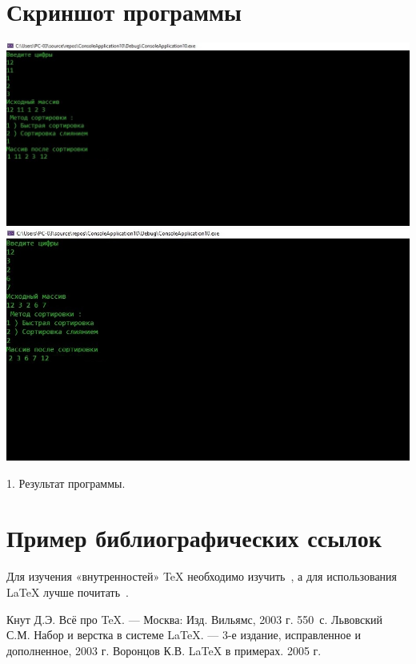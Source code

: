 \documentclass[12pt,a4paper]{scrartcl}
\begin{document}
\section{Скриншот программы}
\label{sec:intro}
\centering
\includegraphics[width=1.0\textwidth]{itog1.jpg}
\includegraphics[width=1.0\textwidth]{itog2.jpg}
\caption{1. Результат программы.}\label{fig:par}
\section{Пример библиографических ссылок}

Для изучения «внутренностей» \TeX{} необходимо 
изучить~\cite{Knuth-2003}, а для использования \LaTeX{} лучше
почитать~\cite{Lvovsky-2003, Voroncov-2005}.

\begin{thebibliography}{9}
Кнут Д.Э. Всё про \TeX. \newblock --- Москва: Изд. Вильямс, 2003 г. 550~с.
Львовский С.М. Набор и верстка в системе \LaTeX{}. \newblock --- 3-е издание, исправленное и дополненное, 2003 г.
Воронцов К.В. \LaTeX{} в примерах. 2005 г.
\end{thebibliography}
\end{document}
